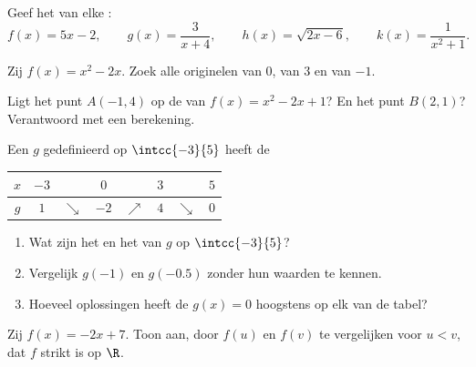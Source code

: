 \begin{exercise}[$\star$]\label{exo:g10:functions:2}
Geef het  van elke :
\[
f(x) = 5x - 2, \qquad
g(x) = \frac{3}{x + 4}, \qquad
h(x) = \sqrt{2x - 6}, \qquad
k(x) = \frac{1}{x^2 + 1}.
\]
\end{exercise}

\begin{exercise}[$\star$]\label{exo:g10:functions:3}
Zij $f(x) = x^2 - 2x$. Zoek alle originelen van $0$, van $3$ en van $-1$.
\end{exercise}

\begin{exercise}[$\star$]\label{exo:g10:functions:4}
Ligt het punt $A(-1, 4)$ op de  van $f(x) = x^2 - 2x + 1$? En het punt
$B(2, 1)$? Verantwoord met een berekening.
\end{exercise}

\begin{exercise}[$\star$]\label{exo:g10:functions:5}
Een  $g$ gedefinieerd op $\intcc{-3}{5}$ heeft de 
\begin{center}
\renewcommand{\arraystretch}{1.3}
\begin{tabular}{c|ccccccc}
$x$ & $-3$ & & $0$ & & $3$ & & $5$ \\
\hline
$g$ & $1$ & $\searrow$ & $-2$ & $\nearrow$ & $4$ & $\searrow$ & $0$ \\
\end{tabular}
\end{center}
\begin{enumerate}
  \item Wat zijn het  en het  van $g$ op $\intcc{-3}{5}$?
  \item Vergelijk $g(-1)$ en $g(-0.5)$ zonder hun waarden te kennen.
  \item Hoeveel oplossingen heeft de  $g(x) = 0$ hoogstens op elk
         van de tabel?
\end{enumerate}
\end{exercise}

\begin{exercise}[$\star\star$]\label{exo:g10:functions:6}
Zij $f(x) = -2x + 7$. Toon aan, door $f(u)$ en $f(v)$ te vergelijken voor
$u < v$, dat $f$ strikt  is op $\R$.
\end{exercise}

